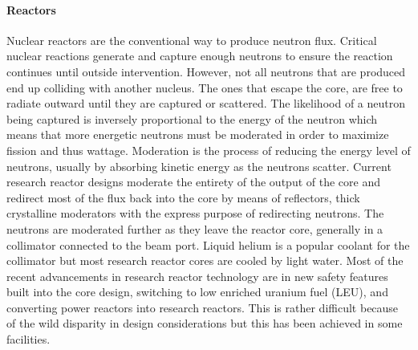 \paragraph{Reactors}
Nuclear reactors are the conventional way to produce neutron flux. Critical nuclear reactions generate and capture enough neutrons to ensure the reaction continues until outside intervention. However, not all neutrons that are produced end up colliding with another nucleus. The ones that escape the core, are free to radiate outward until they are captured or scattered. The likelihood of a neutron being captured is inversely proportional to the energy of the neutron which means that more energetic neutrons must be moderated in order to maximize fission and thus wattage. Moderation is the process of reducing the energy level of neutrons, usually by absorbing kinetic energy as the neutrons scatter. Current research reactor designs moderate the entirety of the output of the core and redirect most of the flux back into the core by means of reflectors, thick crystalline moderators with the express purpose of redirecting neutrons. The neutrons are moderated further as they leave the reactor core, generally in a collimator connected to the beam port. Liquid helium is a popular coolant for the collimator but most research reactor cores are cooled by light water. Most of the recent advancements in research reactor technology are in new safety features built into the core design, switching to low enriched uranium fuel (LEU), and converting power reactors into research reactors. This is rather difficult because of the wild disparity in design considerations but this has been achieved in some facilities.\\
